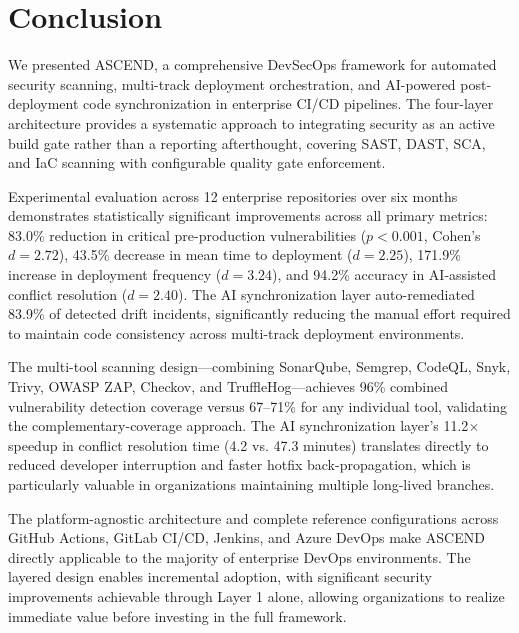 \documentclass[journal]{IEEEtran}
\begin{document}
\section{Conclusion}
\label{sec:conclusion}

We presented ASCEND, a comprehensive DevSecOps framework for automated security scanning, multi-track deployment orchestration, and AI-powered post-deployment code synchronization in enterprise CI/CD pipelines. The four-layer architecture provides a systematic approach to integrating security as an active build gate rather than a reporting afterthought, covering SAST, DAST, SCA, and IaC scanning with configurable quality gate enforcement.

Experimental evaluation across 12 enterprise repositories over six months demonstrates statistically significant improvements across all primary metrics: 83.0\% reduction in critical pre-production vulnerabilities ($p < 0.001$, Cohen's $d = 2.72$), 43.5\% decrease in mean time to deployment ($d = 2.25$), 171.9\% increase in deployment frequency ($d = 3.24$), and 94.2\% accuracy in AI-assisted conflict resolution ($d = 2.40$). The AI synchronization layer auto-remediated 83.9\% of detected drift incidents, significantly reducing the manual effort required to maintain code consistency across multi-track deployment environments.

The multi-tool scanning design---combining SonarQube, Semgrep, CodeQL, Snyk, Trivy, OWASP ZAP, Checkov, and TruffleHog---achieves 96\% combined vulnerability detection coverage versus 67--71\% for any individual tool, validating the complementary-coverage approach. The AI synchronization layer's 11.2$\times$ speedup in conflict resolution time (4.2 vs. 47.3 minutes) translates directly to reduced developer interruption and faster hotfix back-propagation, which is particularly valuable in organizations maintaining multiple long-lived branches.

The platform-agnostic architecture and complete reference configurations across GitHub Actions, GitLab CI/CD, Jenkins, and Azure DevOps make ASCEND directly applicable to the majority of enterprise DevOps environments. The layered design enables incremental adoption, with significant security improvements achievable through Layer 1 alone, allowing organizations to realize immediate value before investing in the full framework.
\end{document}
